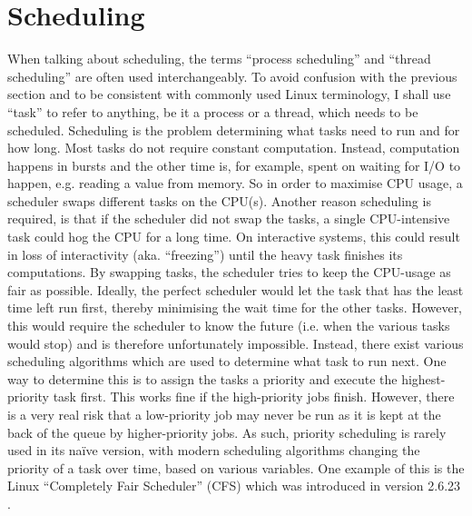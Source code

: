 \section{Scheduling}
When talking about scheduling, the terms ``process scheduling'' and ``thread
scheduling'' are often used interchangeably. To avoid confusion with the
previous section and to be consistent with commonly used Linux terminology, I
shall use ``task'' to refer to anything, be it a process or a thread, which
needs to be scheduled. Scheduling is the problem determining what tasks need to
run and for how long. Most tasks do not require constant computation. Instead,
computation happens in bursts and the other time is, for example, spent on
waiting for I/O to happen, e.g. reading a value from memory. So in order to
maximise CPU usage, a scheduler swaps different tasks on the CPU(s). Another
reason scheduling is required, is that if the scheduler did not swap the tasks,
a single CPU-intensive task could hog the CPU for a long time. On interactive
systems, this could result in loss of interactivity (aka. ``freezing'') until
the heavy task finishes its computations. By swapping tasks, the scheduler tries
to keep the CPU-usage as fair as possible. Ideally, the perfect scheduler would
let the task that has the least time left run first, thereby minimising the wait
time for the other tasks. However, this would require the scheduler to know the
future (i.e. when the various tasks would stop) and is therefore unfortunately
impossible. Instead, there exist various scheduling algorithms which are used to
determine what task to run next. One way to determine this is to assign the
tasks a priority and execute the highest-priority task first. This works fine if
the high-priority jobs finish. However, there is a very real risk that a
low-priority job may never be run as it is kept at the back of the queue by
higher-priority jobs. As such, priority scheduling is rarely used in its
na{\" i}ve version, with modern scheduling algorithms changing the priority of a
task over time, based on various variables. One example of this is the Linux
``Completely Fair Scheduler'' (CFS) which was introduced in version 2.6.23
\cite{noauthor_cfs_nodate}.

